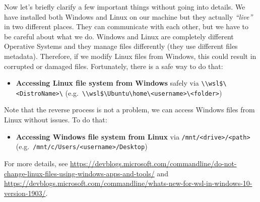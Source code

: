 \documentclass[
  11pt,
]{book}
\providecommand{\tightlist}{%
  \setlength{\itemsep}{0pt}\setlength{\parskip}{0pt}}
\begin{document}
Now let's briefly clarify a few important things without going into details. We have installed both Windows and Linux on our machine but they actually \emph{``live''} in two different places. They can communicate with each other, but we have to be careful about what we do. Windows and Linux are completely different Operative Systems and they manage files differently (they use different files metadata). Therefore, if we modify Linux files from Windows, this could result in corrupted or damaged files. Fortunately, there is a safe way to do that:

\begin{itemize}
\tightlist
\item
  \textbf{Accessing Linux file system from Windows} safely via \texttt{\textbackslash{}\textbackslash{}wsl\$\textbackslash{}\textless{}DistroName\textgreater{}\textbackslash{}} (e.g.~\texttt{\textbackslash{}\textbackslash{}wsl\$\textbackslash{}Ubuntu\textbackslash{}home\textbackslash{}\textless{}username\textgreater{}\textbackslash{}\textless{}folder\textgreater{}})
\end{itemize}

Note that the reverse process is not a problem, we can access Windows files from Linux without issues. To do that:

\begin{itemize}
\tightlist
\item
  \textbf{Accessing Windows file system from Linux} via \texttt{/mnt/\textless{}drive\textgreater{}/\textless{}path\textgreater{}} (e.g.~\texttt{/mnt/c/Users/\textless{}username\textgreater{}/Desktop})
\end{itemize}

For more details, see \url{https://devblogs.microsoft.com/commandline/do-not-change-linux-files-using-windows-apps-and-tools/} and \url{https://devblogs.microsoft.com/commandline/whats-new-for-wsl-in-windows-10-version-1903/}.
\end{document}
